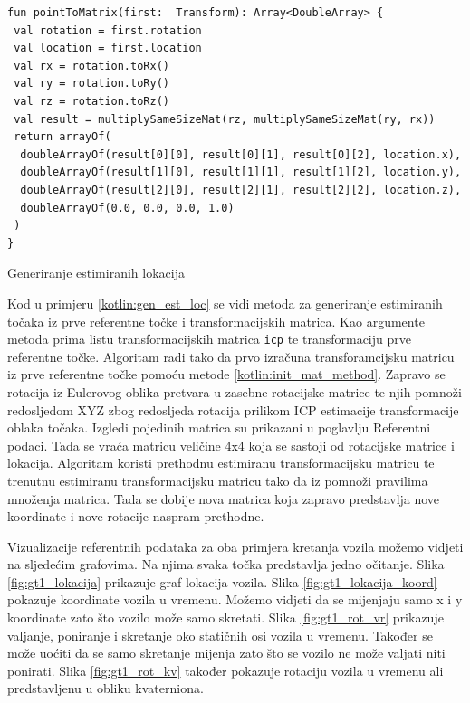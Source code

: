 \begin{listing}[h!]
  \begin{verbatim}
fun pointToMatrix(first:  Transform): Array<DoubleArray> {
 val rotation = first.rotation
 val location = first.location
 val rx = rotation.toRx()
 val ry = rotation.toRy()
 val rz = rotation.toRz()
 val result = multiplySameSizeMat(rz, multiplySameSizeMat(ry, rx))
 return arrayOf(
  doubleArrayOf(result[0][0], result[0][1], result[0][2], location.x),
  doubleArrayOf(result[1][0], result[1][1], result[1][2], location.y),
  doubleArrayOf(result[2][0], result[2][1], result[2][2], location.z),
  doubleArrayOf(0.0, 0.0, 0.0, 1.0)
 )
}
  \end{verbatim}
  \caption{Generiranje estimiranih lokacija}
  \label{kotlin:init_mat_method}
\end{listing}

Kod u primjeru \ref{kotlin:gen_est_loc} se vidi metoda za generiranje estimiranih točaka iz prve referentne točke i transformacijskih matrica. Kao argumente metoda prima listu transformacijskih matrica \texttt{icp} te transformaciju prve referentne točke. Algoritam radi tako da prvo izračuna transforamcijsku matricu iz prve referentne točke pomoću metode \ref{kotlin:init_mat_method}. Zapravo se rotacija iz Eulerovog oblika pretvara u zasebne rotacijske matrice te njih pomnoži redosljedom XYZ zbog redosljeda rotacija prilikom ICP estimacije transformacije oblaka točaka. Izgledi pojedinih matrica su prikazani u poglavlju Referentni podaci. Tada se vraća matricu veličine 4x4 koja se sastoji od rotacijske matrice i lokacija. Algoritam koristi prethodnu estimiranu transformacijsku matricu te trenutnu estimiranu transformacijsku matricu tako da iz pomnoži pravilima množenja matrica. Tada se dobije nova matrica koja zapravo predstavlja nove koordinate i nove rotacije naspram prethodne.

Vizualizacije referentnih podataka za oba primjera kretanja vozila možemo vidjeti na sljedećim grafovima. Na njima svaka točka predstavlja jedno očitanje. Slika \ref{fig:gt1_lokacija} prikazuje graf lokacija vozila. Slika \ref{fig:gt1_lokacija_koord} pokazuje koordinate vozila u vremenu. Možemo vidjeti da se mijenjaju samo x i y koordinate zato što vozilo može samo skretati. Slika \ref{fig:gt1_rot_vr} prikazuje valjanje, poniranje i skretanje oko statičnih osi vozila u vremenu. Također se može uoćiti da se samo skretanje mijenja zato što se vozilo ne može valjati niti ponirati. Slika \ref{fig:gt1_rot_kv} također pokazuje rotaciju vozila u vremenu ali predstavljenu u obliku kvaterniona.

